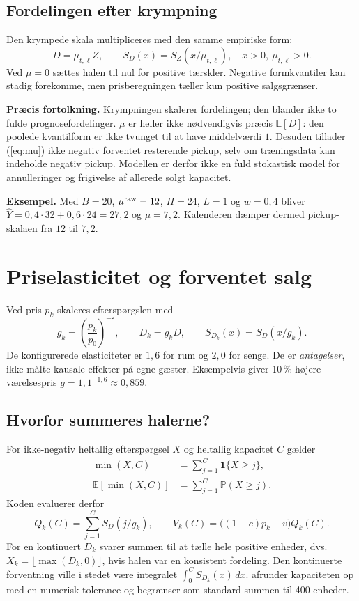 \documentclass[11pt,a4paper]{article}
\newcommand{\E}{\mathbb E}\newcommand{\Prob}{\mathbb P}
\newcommand{\code}[1]{\texttt{\small\detokenize{#1}}}
\begin{document}
\subsection{Fordelingen efter krympning}
Den krympede skala multipliceres med den samme empiriske form:
\begin{equation}
D=\mu_{t,\ell}Z,\qquad S_D(x)=S_Z(x/\mu_{t,\ell}),\quad x>0,\ \mu_{t,\ell}>0.
\end{equation}
Ved $\mu=0$ sættes halen til nul for positive tærskler. Negative formkvantiler
kan stadig forekomme, men prisberegningen tæller kun positive salgsgrænser.

\textbf{Præcis fortolkning.} Krympningen skalerer fordelingen; den blander ikke
to fulde prognosefordelinger. $\mu$ er heller ikke nødvendigvis præcis
$\E[D]$: den poolede kvantilform er ikke tvunget til at have middelværdi $1$.
Desuden tillader (\ref{eq:mu}) ikke negativ forventet resterende pickup, selv om
træningsdata kan indeholde negativ pickup. Modellen er derfor ikke en fuld
stokastisk model for annulleringer og frigivelse af allerede solgt kapacitet.

\textbf{Eksempel.} Med $B=20$, $\mu^{\rm raw}=12$, $H=24$, $L=1$ og
$w=0{,}4$ bliver $\widehat Y=0{,}4\cdot32+0{,}6\cdot24=27{,}2$ og
$\mu=7{,}2$. Kalenderen dæmper dermed pickup-skalaen fra $12$ til $7{,}2$.

\newpage
\section{Priselasticitet og forventet salg}
Ved pris $p_k$ skaleres efterspørgslen med
\begin{equation}
g_k=\left(\frac{p_k}{p_0}\right)^{-\varepsilon},\qquad
D_k=g_kD,\qquad S_{D_k}(x)=S_D(x/g_k).
\end{equation}
De konfigurerede elasticiteter er $1{,}6$ for rum og $2{,}0$ for senge. De er
\emph{antagelser}, ikke målte kausale effekter på egne gæster. Eksempelvis giver
10\,\% højere værelsespris $g=1{,}1^{-1{,}6}\approx0{,}859$.

\subsection{Hvorfor summeres halerne?}
For ikke-negativ heltallig efterspørgsel $X$ og heltallig kapacitet $C$ gælder
\begin{align}
\min(X,C)&=\sum_{j=1}^{C}\mathbf1\{X\geq j\},\\
\E[\min(X,C)]&=\sum_{j=1}^{C}\Prob(X\geq j).
\end{align}
Koden evaluerer derfor
\begin{equation}
Q_k(C)=\sum_{j=1}^{C}S_D(j/g_k),\qquad V_k(C)=\bigl((1-c)p_k-v\bigr)Q_k(C).
\end{equation}
For en kontinuert $D_k$ svarer summen til at tælle hele positive enheder, dvs.
$X_k=\lfloor\max(D_k,0)\rfloor$, hvis halen var en konsistent fordeling.
Den kontinuerte forventning ville i stedet være integralet
$\int_0^C S_{D_k}(x)\,dx$.
\code{expected_sales} afrunder kapaciteten op med en numerisk tolerance og
begrænser som standard summen til 400 enheder.
\end{document}
